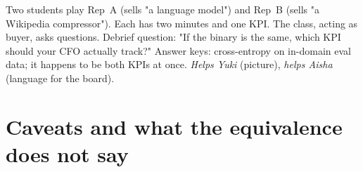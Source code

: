 \documentclass[12pt,a4paper]{article}
\theoremstyle{plain}
\theoremstyle{definition}
\begin{document}
\begin{activity}[title={Activity 4 --- Two-vendors role-play}]
Two students play Rep~A (sells "a language model") and Rep~B
(sells "a Wikipedia compressor").  Each has two minutes and one
KPI.  The class, acting as buyer, asks questions.  Debrief
question: "If the binary is the same, which KPI should your CFO
actually track?"  Answer keys: cross-entropy on in-domain eval
data; it happens to be both KPIs at once.  \emph{Helps Yuki}
(picture), \emph{helps Aisha} (language for the board).
\end{activity}



\section{Caveats and what the equivalence does not say}
\label{sec:caveats}
\end{document}

